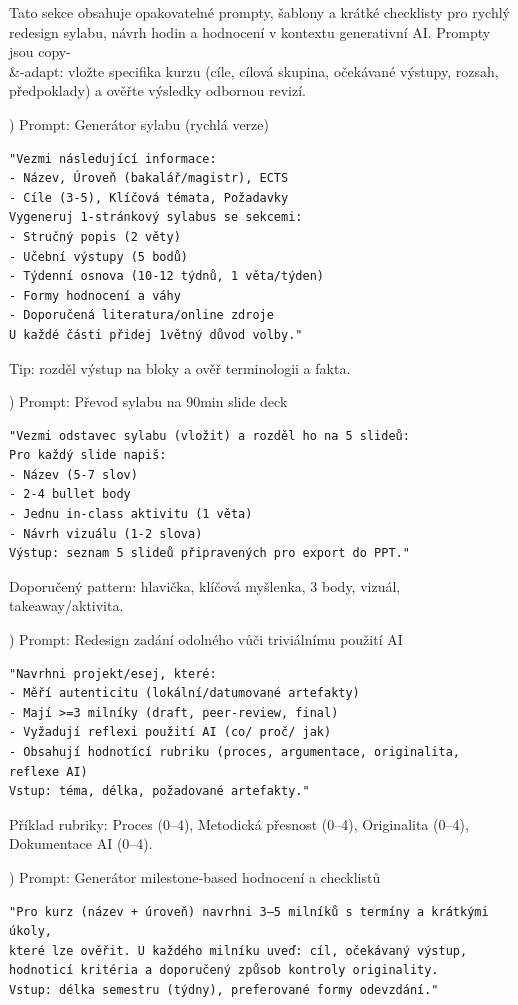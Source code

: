 Tato sekce obsahuje opakovatelné prompty, šablony a krátké checklisty pro rychlý redesign sylabu, návrh hodin a hodnocení v kontextu generativní AI. Prompty jsou copy-\\ \&-adapt: vložte specifika kurzu (cíle, cílová skupina, očekávané výstupy, rozsah, předpoklady) a ověřte výsledky odbornou revizí.

\medskip
{}) Prompt: Generátor sylabu (rychlá verze)
\begin{verbatim}
"Vezmi následující informace:
- Název, Úroveň (bakalář/magistr), ECTS
- Cíle (3-5), Klíčová témata, Požadavky
Vygeneruj 1-stránkový sylabus se sekcemi:
- Stručný popis (2 věty)
- Učební výstupy (5 bodů)
- Týdenní osnova (10-12 týdnů, 1 věta/týden)
- Formy hodnocení a váhy
- Doporučená literatura/online zdroje
U každé části přidej 1větný důvod volby."
\end{verbatim}
Tip: rozděl výstup na bloky a ověř terminologii a fakta.

\medskip
{}) Prompt: Převod sylabu na 90min slide deck
\begin{verbatim}
"Vezmi odstavec sylabu (vložit) a rozděl ho na 5 slideů:
Pro každý slide napiš:
- Název (5-7 slov)
- 2-4 bullet body
- Jednu in-class aktivitu (1 věta)
- Návrh vizuálu (1-2 slova)
Výstup: seznam 5 slideů připravených pro export do PPT."
\end{verbatim}
Doporučený pattern: hlavička, klíčová myšlenka, 3 body, vizuál, takeaway/aktivita.

\medskip
{}) Prompt: Redesign zadání odolného vůči triviálnímu použití AI
\begin{verbatim}
"Navrhni projekt/esej, které:
- Měří autenticitu (lokální/datumované artefakty)
- Mají >=3 milníky (draft, peer-review, final)
- Vyžadují reflexi použití AI (co/ proč/ jak)
- Obsahují hodnotící rubriku (proces, argumentace, originalita, reflexe AI)
Vstup: téma, délka, požadované artefakty."
\end{verbatim}
Příklad rubriky: Proces (0–4), Metodická přesnost (0–4), Originalita (0–4), Dokumentace AI (0–4).

\medskip
{}) Prompt: Generátor milestone‑based hodnocení a checklistů
\begin{verbatim}
"Pro kurz (název + úroveň) navrhni 3–5 milníků s termíny a krátkými úkoly,
které lze ověřit. U každého milníku uveď: cíl, očekávaný výstup,
hodnoticí kritéria a doporučený způsob kontroly originality.
Vstup: délka semestru (týdny), preferované formy odevzdání."
\end{verbatim}

